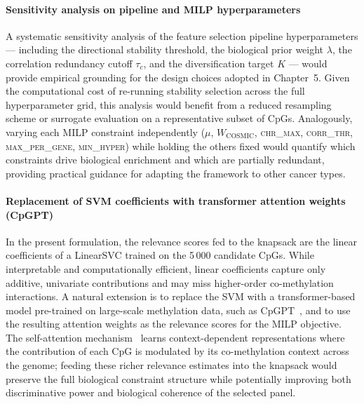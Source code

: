 \paragraph{Sensitivity analysis on pipeline and MILP hyperparameters}
A systematic sensitivity analysis of the feature selection pipeline
hyperparameters --- including the directional stability threshold, the
biological prior weight $\lambda$, the correlation redundancy cutoff
$\tau_c$, and the diversification target $K$ --- would provide empirical
grounding for the design choices adopted in Chapter~5.
Given the computational cost of re-running stability selection across the
full hyperparameter grid, this analysis would benefit from a reduced
resampling scheme or surrogate evaluation on a representative subset of
CpGs.
Analogously, varying each MILP constraint independently ($\mu$,
$W_{\mathrm{COSMIC}}$, \textsc{chr\_max}, \textsc{corr\_thr},
\textsc{max\_per\_gene}, \textsc{min\_hyper}) while holding the others
fixed would quantify which constraints drive biological enrichment and which
are partially redundant, providing practical guidance for adapting the
framework to other cancer types.

\paragraph{Replacement of SVM coefficients with transformer attention
weights (CpGPT)}
In the present formulation, the relevance scores fed to the knapsack are
the linear coefficients of a LinearSVC trained on the 5\,000 candidate
CpGs.
While interpretable and computationally efficient, linear coefficients
capture only additive, univariate contributions and may miss higher-order
co-methylation interactions.
A natural extension is to replace the SVM with a transformer-based model
pre-trained on large-scale methylation data, such as
CpGPT~\cite{levy2024cpgpt}, and to use the resulting attention weights as
the relevance scores for the MILP objective.
The self-attention mechanism~\cite{vaswani2017attention} learns
context-dependent representations where the contribution of each CpG is
modulated by its co-methylation context across the genome; feeding these
richer relevance estimates into the knapsack would preserve the full
biological constraint structure while potentially improving both
discriminative power and biological coherence of the selected panel.

